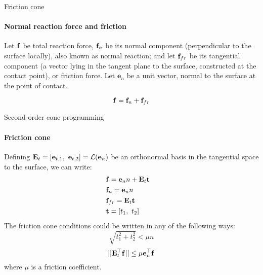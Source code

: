 \documentclass{beamer}
\begin{document}
\begin{frame}{Friction cone}
\framesubtitle{Normal reaction force and friction}
\begin{flushleft}

\begin{figure}
    \centering
    
    \label{fig:contact}
\end{figure}

Let $\mathbf{f}$ be total reaction force, $\mathbf{f}_n$ be its normal component (perpendicular to the surface locally), also known as normal reaction; and let $\mathbf{f}_{fr}$ be its tangential component (a vector lying in the tangent plane to the surface, constructed at the contact point), or friction force. Let $\mathbf{e}_n$ be a unit vector, normal to the surface at the point of contact.

\begin{equation}
    \mathbf{f} =  \mathbf{f}_n + \mathbf{f}_{fr}
\end{equation}

\end{flushleft}
\end{frame}



\begin{frame}{Second-order cone programming}
\framesubtitle{Friction cone}
\begin{flushleft}

Defining $\bo{E}_t = [\mathbf{e}_{t, 1}, \ \mathbf{e}_{t, 2}] = \mathcal{L}(\mathbf{e}_n)$ be an orthonormal basis in the tangential space to the surface, we can write:
%
\begin{align*}
\label{friction_cone}
    & \mathbf{f} = \mathbf{e}_n n + \mathbf{E}_t \mathbf{t} & \\
    & \mathbf{f}_n = \mathbf{e}_n n & \\
    & \mathbf{f}_{fr} = \mathbf{E}_t \mathbf{t} & \\
    & \mathbf{t} = [t_1, \ t_2]
\end{align*}
%
The friction cone conditions could be written in any of the following ways:
%
\begin{equation}
\label{friction_cone}
    \sqrt{t_1^2 + t_2^2} < \mu n
\end{equation}
%
\begin{equation}
    || \mathbf{E}_t^\top \mathbf{f} || \leq \mu \mathbf{e}_n^\top \mathbf{f}
\end{equation}
%
where $\mu$ is a friction coefficient.
 
\end{flushleft}
\end{frame}
\end{document}
